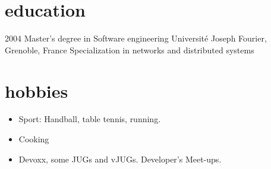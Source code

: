 \documentclass[]{k-cv} %
\begin{document}
\section{education}

\begin{entrylist}
\entry
{2004}
{Master's degree {\normalfont in Software engineering}}
{Universit\'{e} Joseph Fourier, Grenoble, France}
{Specialization in networks and distributed systems}
\end{entrylist}



\section{hobbies}
\vspace{-0.2cm}
\begin{freetext}
{
\begin{itemize}
  \item
  Sport: Handball, table tennis, running.
  \item
  Cooking
  \item
  Devoxx, some JUGs and vJUGs.
  Developer's Meet-ups.
\end{itemize}
}
\end{freetext}
\end{document}

